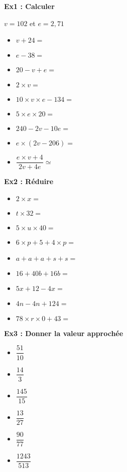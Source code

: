 \begin{multicols}{3}

\textbf{Ex1 : Calculer}

$v = 102$ et $e = 2,71$

\begin{itemize}[label={$\bullet$}]
  \item $v + 24 = $ \dotfill
  \item $e - 38 = $ \dotfill
  \item $20 - v + e= $ \dotfill
  \item $2 \times v = $ \dotfill
  \item $10 \times v \times e - 134 = $ \dotfill
  \item $5 \times  e \times 20 = $ \dotfill
  \item $240 - 2v - 10e = $ \dotfill
  \item $e \times (2v - 206) = $ \dotfill
  \item $\dfrac{e \times v + 4}{2v + 4e} \simeq$ \dotfill
\end{itemize} \columnbreak 

\textbf{Ex2 : Réduire}

\begin{itemize}[label={$\bullet$}]
  \item $ 2 \times x = $ \dotfill
  \item $ t \times 32 = $ \dotfill
  \item $ 5 \times  u \times 40 = $ \dotfill
  \item $ 6 \times p + 5 + 4 \times p = $ \dotfill
  \item $ a + a + a + s + s = $ \dotfill
  \item $ 16 + 40b + 16b = $ \dotfill
  \item $ 5x + 12 - 4x = $ \dotfill
  \item $ 4n - 4n + 124 = $ \dotfill
  \item $ 78 \times r \times 0 + 43 = $ \dotfill
\end{itemize} \columnbreak 

\textbf{Ex3 : Donner la valeur approchée}

\begin{itemize}[label={$\bullet$}]
  \item $ \dfrac{51}{10}    $ \dotfill \\
  \item $ \dfrac{14}{3}     $ \dotfill \\ 
  \item $ \dfrac{145}{15}   $ \dotfill \\
  \item $ \dfrac{13}{27}    $ \dotfill \\
  \item $ \dfrac{90}{77}    $ \dotfill \\
  \item $ \dfrac{1243}{513} $ \dotfill \\
\end{itemize}

\end{multicols}

